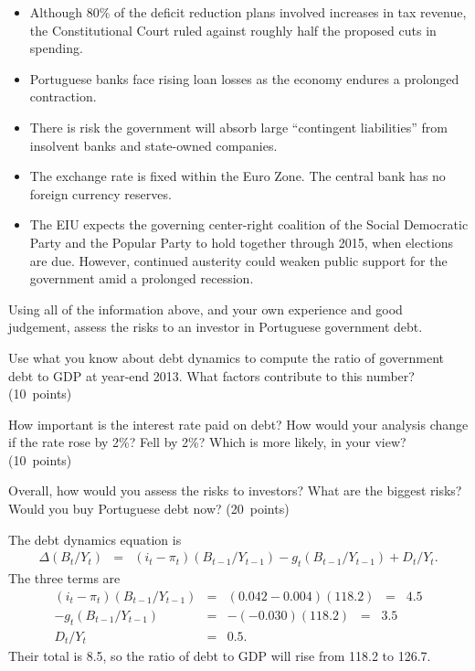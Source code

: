 \documentclass[letterpaper,12pt]{exam}
\begin{document}
\begin{questions}
\begin{itemize}
\item Although 80\% of the deficit reduction plans involved increases in
tax revenue, the Constitutional Court ruled against roughly half the proposed
cuts in spending.

\item Portuguese banks face rising loan losses as the economy endures a prolonged
contraction.

\item There is risk the government will absorb large
``contingent liabilities'' from insolvent banks and state-owned companies.

\item The exchange rate is fixed within the Euro Zone.
The central bank has no foreign currency reserves.

\item The EIU expects the governing center-right coalition
of the Social Democratic Party and the Popular Party
to hold together through 2015, when elections are due.
However, continued austerity could weaken public support for the government
amid a prolonged recession.
\end{itemize}

Using all of the information above, and your own experience and good judgement,
assess the risks to an investor in Portuguese government debt.
%
\begin{parts}
\item Use what you know about debt dynamics to compute the ratio
of government debt to GDP at year-end 2013.
What factors contribute to this number?
(10~points)
\item How important is the interest rate paid on debt?
How would your analysis change if the rate rose by 2\%?
Fell by 2\%?
Which is more likely, in your view?
(10~points)
\item Overall, how would you assess the risks to investors?
What are the biggest risks?
Would you buy Portuguese debt now?
(20~points)
\end{parts}

\begin{solution}
\begin{parts}
\item The debt dynamics equation is
\begin{eqnarray*}
   \Delta (B_t/Y_t)  &=&  (i_t - \pi_t)(B_{t-1}/Y_{t-1})
                - g_t (B_{t-1}/Y_{t-1}) + D_t/Y_t .
\end{eqnarray*}
The three terms are
\begin{eqnarray*}
    (i_t - \pi_t)(B_{t-1}/Y_{t-1}) &=& (0.042 - 0.004) (118.2) \;\;=\;\; 4.5  \\                - g_t (B_{t-1}/Y_{t-1})   &=& - (-0.030) (118.2) \;\;=\;\; 3.5 \\
    D_t/Y_t  &=&  0.5 .
\end{eqnarray*}
Their total is 8.5, so the ratio of debt to GDP will rise from 118.2 to 126.7.


\end{parts}
\end{solution}
\end{questions}
\end{document}
